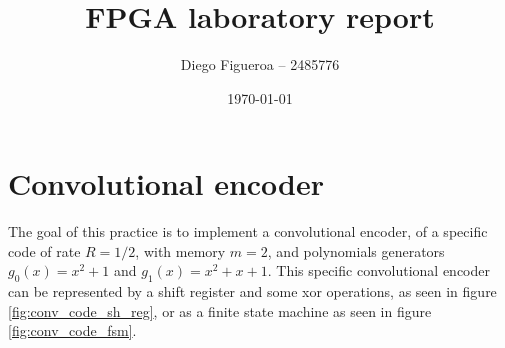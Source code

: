 \documentclass[12pt]{article}   	%
\title{FPGA laboratory report}
\author{Diego Figueroa -- 2485776}
\date{\today}							%
\begin{document}
\maketitle


\section{Convolutional encoder}

The goal of this practice is to implement a convolutional encoder, of a specific code of rate $R=1/2$, with memory $m=2$, and polynomials generators $g_0(x) = x^2+1$ and $g_1(x)=x^2+x+1$. This specific convolutional encoder can be represented by a shift register and some xor operations, as seen in figure \ref{fig:conv_code_sh_reg}, or as a finite state machine as seen in figure \ref{fig:conv_code_fsm}.
\end{document}
